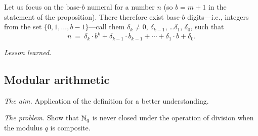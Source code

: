 Let us focus on the base-$b$ numeral for a number $n$ (so $b = m+1$ in
the statement of the proposition).  There therefore exist base-$b$
digits---i.e., integers from the set $\{0, 1, \ldots, b-1\}$---call
them $\delta_k \neq 0$, $\delta_{k-1}$, \ldots $\delta_1$, $\delta_0$,
such that
\[ n \ = \ \delta_k \cdot b^k + \delta_{k-1} \cdot b_{k-1} + \cdots +
\delta_1 \cdot b + \delta_0. \]
%
%
%
\medskip

\noindent \textit{Lesson learned.}


\subsection{Modular arithmetic}

\noindent \textit{The aim.}
Application of the definition for a better understanding.
\medskip

\noindent \textit{The problem.}
Show that $\mathbb{N}_q$ is never closed under the operation of division when the modulus $q$ is composite.
\medskip

